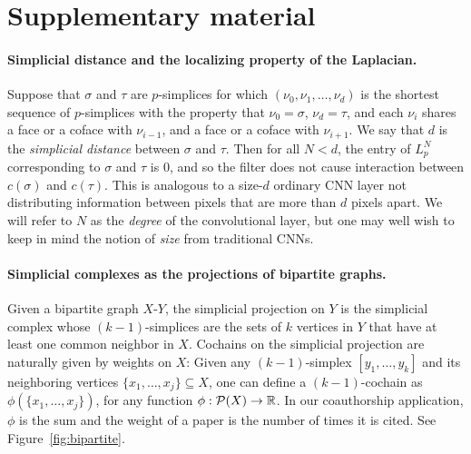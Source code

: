 \section{Supplementary material}

\paragraph{Simplicial distance and the localizing property of the Laplacian.}
Suppose that $\sigma$ and $\tau$ are $p$-simplices for which $(\nu_0, \nu_1, \dotsc, \nu_d)$ is the shortest sequence of $p$-simplices with the property that $\nu_0=\sigma$, $\nu_d=\tau$, and each $\nu_i$ shares a face or a coface with $\nu_{i-1}$, and a face or a coface with $\nu_{i+1}$. We say that $d$ is the \emph{simplicial distance} between $\sigma$ and $\tau$. Then for all $N<d$, the entry of $L_p^N$ corresponding to $\sigma$ and $\tau$ is $0$, and so the filter does not cause interaction between $c(\sigma)$ and $c(\tau)$. This is analogous to a size-$d$ ordinary CNN layer not distributing information between pixels that are more than $d$ pixels apart. We will refer to $N$ as the \emph{degree} of the convolutional layer, but one may well wish to keep in mind the notion of \emph{size} from traditional CNNs.

\paragraph{Simplicial complexes as the projections of bipartite graphs.}
Given a bipartite graph $X$-$Y$, the simplicial projection on $Y$ is the simplicial complex whose $(k-1)$-simplices are the sets of $k$ vertices in $Y$ that have at least one common neighbor in $X$.
Cochains on the simplicial projection are naturally given by weights on $X$: Given any $(k-1)$-simplex $[y_1,\dots,y_k]$ and its neighboring vertices $\{x_1,\dots,x_j\}\subseteq X$, one can define a $(k-1)$-cochain as $\phi(\{x_1,\dots,x_j\})$, for any function $\phi: \mathcal{P}(X)\to\mathbb{R}$.
In our coauthorship application, $\phi$ is the sum and the weight of a paper is the number of times it is cited.
See Figure~\ref{fig:bipartite}.

